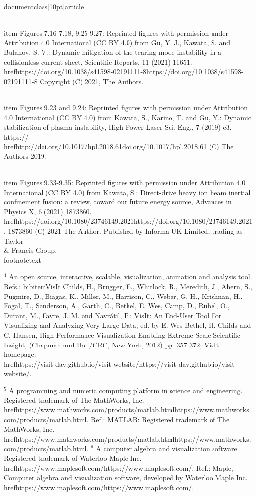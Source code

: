 \\documentclass[10pt]{article}
\begin{document}
  \\item Figures 7.16-7.18, 9.25-9.27: Reprinted figures with permission under Attribution 4.0 International (CC BY 4.0) from Gu, Y. J., Kawata, S. and Bulanov, S. V.: Dynamic mitigation of the tearing mode instability in a collisionless current sheet, Scientific Reports, 11 (2021) 11651. \\href{https://doi.org/10.1038/s41598-02191111-8}{https://doi.org/10.1038/s41598-02191111-8} Copyright (C) 2021, The Authors.

  \\item Figures 9.23 and 9.24: Reprinted figures with permission under Attribution 4.0 International (CC BY 4.0) from Kawata, S., Karino, T. and Gu, Y.: Dynamic stabilization of plasma instability, High Power Laser Sci. Eng., 7 (2019) e3. https:// \\href{http://doi.org/10.1017/hpl.2018.61}{doi.org/10.1017/hpl.2018.61} (C) The Authors 2019.

  \\item Figures 9.33-9.35: Reprinted figures with permission under Attribution 4.0 International (CC BY 4.0) from Kawata, S.: Direct-drive heavy ion beam inertial confinement fusion: a review, toward our future energy source, Advances in Physics X, 6 (2021) 1873860. \\href{https://doi.org/10.1080/23746149.2021}{https://doi.org/10.1080/23746149.2021}. 1873860 (C) 2021 The Author. Published by Informa UK Limited, trading as Taylor \\& Francis Group.
\\footnotetext{${ }^{4}$ An open source, interactive, scalable, visualization, animation and analysis tool. Refs.: bibitemVisIt Childs, H., Brugger, E., Whitlock, B., Meredith, J., Ahern, S., Pugmire, D., Biagas, K., Miller, M., Harrison, C., Weber, G. H., Krishnan, H., Fogal, T., Sanderson, A., Garth, C., Bethel, E. Wes, Camp, D., Rübel, O., Durant, M., Favre, J. M. and Navrátil, P.: VisIt: An End-User Tool For Visualizing and Analyzing Very Large Data, ed. by E. Wes Bethel, H. Childs and C. Hansen, High Performance Visualization-Enabling Extreme-Scale Scientific Insight, (Chapman and Hall/CRC, New York, 2012) pp. 357-372; VisIt homepage: \\href{https://visit-dav.github.io/visit-website/}{https://visit-dav.github.io/visit-website/}.

${ }^{5}$ A programming and numeric computing platform in science and engineering. Registered trademark of The MathWorks, Inc. \\href{https://www.mathworks.com/products/matlab.html}{https://www.mathworks.com/products/matlab.html}. Ref.: MATLAB: Registered trademark of The MathWorks, Inc. \\href{https://www.mathworks.com/products/matlab.html}{https://www.mathworks.com/products/matlab.html}. ${ }^{6}$ A computer algebra and visualization software. Registered trademark of Waterloo Maple Inc. \\href{https://www.maplesoft.com/}{https://www.maplesoft.com/}. Ref.: Maple, Computer algebra and visualization software, developed by Waterloo Maple Inc. \\href{https://www.maplesoft.com/}{https://www.maplesoft.com/}.
}
\end{document}
